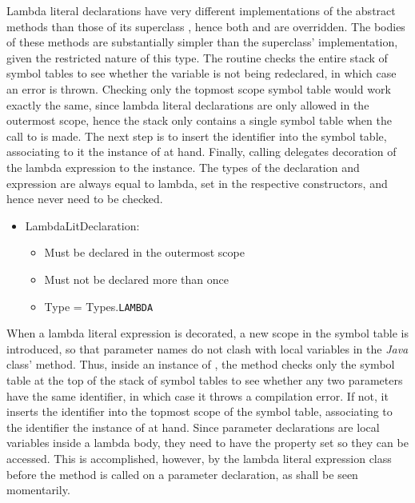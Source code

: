 Lambda literal declarations have very different implementations of the  abstract methods than those of its superclass , hence both  and  are overridden. The bodies of these methods are substantially simpler than the superclass' implementation, given the restricted nature of this type. The  routine checks the entire stack of symbol tables to see whether the variable is not being redeclared, in which case an error is thrown. Checking only the topmost scope symbol table would work exactly the same, since lambda literal declarations are only allowed in the outermost scope, hence the stack only contains a single symbol table when the call to  is made. The next step is to insert the identifier into the symbol table, associating to it the instance of  at hand. Finally, calling  delegates decoration of the lambda expression to the  instance. The types of the declaration and expression are always equal to lambda, set in the respective constructors, and hence never need to be checked.

\begin{itemize}
	\item LambdaLitDeclaration:
		\begin{itemize}
			\item Must be declared in the outermost scope
			\item Must not be declared more than once
			\item Type = Types.\texttt{LAMBDA}
		\end{itemize}
\end{itemize}

When a lambda literal expression is decorated, a new scope in the symbol table is introduced, so that parameter names do not clash with local variables in the \emph{Java} class'  method. Thus, inside an instance of , the  method checks only the symbol table at the top of the stack of symbol tables to see whether any two parameters have the same identifier, in which case it throws a compilation error. If not, it inserts the identifier into the topmost scope of the symbol table, associating to the identifier the instance of  at hand. Since parameter declarations are local variables inside a lambda body, they need to have the  property set so they can be accessed. This is accomplished, however, by the lambda literal expression class before the  method is called on a parameter declaration, as shall be seen momentarily.

